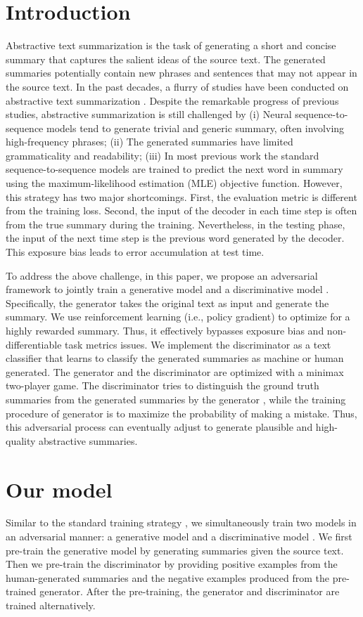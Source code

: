 \documentclass[letterpaper]{article} \usepackage{aaai18}  \usepackage{times}  \usepackage{helvet}  \usepackage{courier}  \usepackage{url}  \usepackage{graphicx}  \frenchspacing  \usepackage{multirow}
\begin{document}
\section{Introduction}
Abstractive text summarization is the task of generating a short and concise summary that captures the salient ideas of the source text.  The generated summaries potentially contain new phrases and sentences that may not appear in the source text. 
In the past decades, a flurry of studies have been conducted on abstractive text summarization \cite{nallapati2016abstractive,see2017get,paulus2017deep}. Despite the remarkable progress of previous studies, abstractive summarization is still challenged by (i) Neural sequence-to-sequence models tend to generate trivial and generic summary, often involving high-frequency phrases; (ii) The generated summaries have limited grammaticality and readability; (iii) In most previous work the standard sequence-to-sequence models are trained to predict the next word in summary using the maximum-likelihood estimation (MLE) objective function. However, this strategy has two major shortcomings. First, the evaluation metric is different from the training loss. Second, the input of the decoder in each time step is often from the true summary during the training. Nevertheless, in the testing phase, the input of the next time step is the previous word generated by the decoder. This exposure bias leads to error accumulation at test time.

To address the above challenge, in this paper, we propose an adversarial framework to jointly train a generative model  and a discriminative model .  Specifically, the generator  takes the original text as input and generate the summary. We use reinforcement learning (i.e., policy gradient) to optimize  for a highly rewarded summary. Thus, it effectively bypasses exposure bias and non-differentiable task metrics issues.  We implement the discriminator  as a text classifier that learns to classify the generated summaries as machine or human generated. The generator  and the discriminator  are optimized with a minimax two-player game. The discriminator  tries to distinguish the ground truth summaries from the generated summaries by the generator , while the training procedure of generator  is to maximize the probability of  making a mistake. Thus, this adversarial process can eventually adjust  to generate plausible and high-quality abstractive summaries.


\section{Our model}
Similar to the standard training strategy \cite{goodfellow2014generative}, we simultaneously train two models in an adversarial manner: a generative model  and a discriminative model .  We first pre-train the generative model by generating summaries given the source text. Then we pre-train the discriminator by providing positive examples from the human-generated summaries and the negative examples produced from the pre-trained generator. After the pre-training, the generator and discriminator are trained alternatively.
\end{document}
